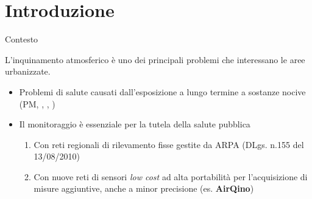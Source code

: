\section{Introduzione}
\begin{frame}{Contesto}

L’inquinamento atmosferico è uno dei principali problemi che interessano le aree urbanizzate.
\vspace{0.3cm}
\begin{itemize}
 \item Problemi di salute causati dall’esposizione a lungo termine a sostanze nocive (PM, , , )\vspace{0.3cm}
 \item Il monitoraggio è essenziale per la tutela della salute pubblica\vspace{0.1cm}
 \begin{enumerate}
 \item Con reti regionali di rilevamento fisse gestite da ARPA (DLgs. n.155 del 13/08/2010)\vspace{0.1cm}
 \item Con nuove reti di sensori \textit{low cost} ad alta portabilità per l'acquisizione di misure aggiuntive, anche a minor precisione (es. \textbf{AirQino})
\end{enumerate}
\end{itemize}

\end{frame}

